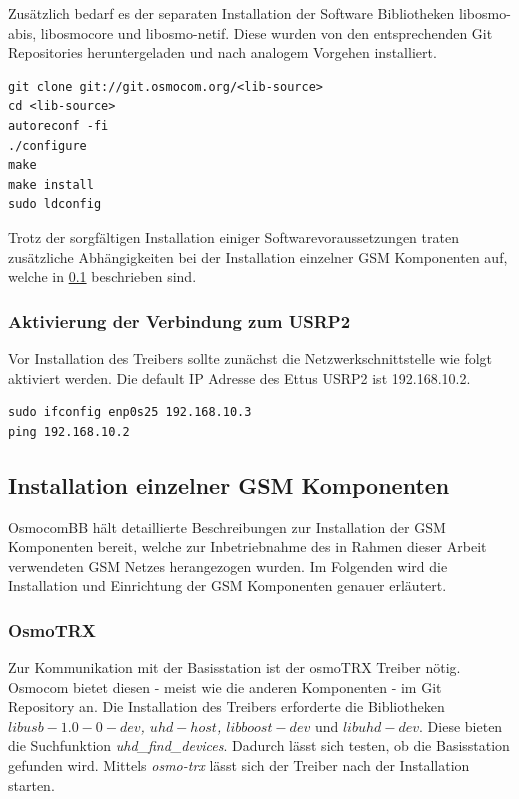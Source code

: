 Zusätzlich bedarf es der separaten Installation der Software Bibliotheken libosmo-abis, libosmocore und libosmo-netif. Diese wurden von den entsprechenden Git Repositories heruntergeladen und nach analogem Vorgehen installiert.

\begin{lstlisting}
git clone git://git.osmocom.org/<lib-source>
cd <lib-source>
autoreconf -fi
./configure
make
make install
sudo ldconfig
\end{lstlisting}

Trotz der sorgfältigen Installation einiger Softwarevoraussetzungen traten zusätzliche Abhängigkeiten bei der Installation einzelner GSM Komponenten auf, welche in \ref{GSM_Komp_Osmocom} beschrieben sind.

\subsubsection{Aktivierung der Verbindung zum USRP2}
Vor Installation des Treibers sollte zunächst die Netzwerkschnittstelle wie folgt aktiviert werden. Die default IP Adresse des Ettus USRP2 ist 192.168.10.2. 

\begin{lstlisting}
sudo ifconfig enp0s25 192.168.10.3
ping 192.168.10.2
\end{lstlisting}

\subsection{Installation einzelner GSM Komponenten}\label{GSM_Komp_Osmocom}
OsmocomBB hält detaillierte Beschreibungen zur Installation der GSM Komponenten bereit, welche zur Inbetriebnahme des in Rahmen dieser Arbeit verwendeten GSM Netzes herangezogen wurden. Im Folgenden wird die Installation und Einrichtung der GSM Komponenten genauer erläutert. 

\subsubsection{OsmoTRX}
Zur Kommunikation mit der Basisstation ist der osmoTRX Treiber nötig. Osmocom bietet diesen - meist wie die anderen Komponenten - im Git Repository an. Die Installation des Treibers erforderte die Bibliotheken \textit{$libusb-1.0-0-dev$, $uhd-host$, $libboost-dev$} und \textit{$libuhd-dev$}. Diese bieten die Suchfunktion \textit{uhd\_find\_devices}. Dadurch lässt sich testen, ob die Basisstation gefunden wird. Mittels \textit{osmo-trx} lässt sich der Treiber nach der Installation starten.

